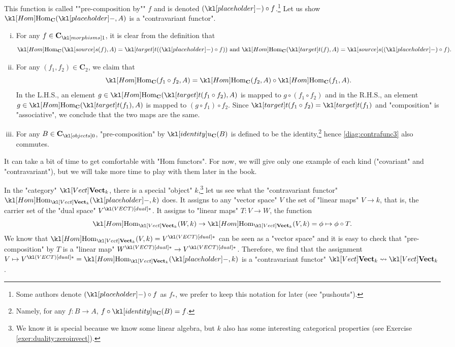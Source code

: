 \documentclass[main.tex]{subfiles}
\begin{document}
\begin{exmp}
\begin{enumerate}
		\AP This function is called ""pre-composition by"" $f$ and is denoted $(\placeholder) \circ f$.\footnote{Some authors denote $(\placeholder) \circ f$ as $f_*$, we prefer to keep this notation for later (see "pushouts").} Let us show $\Hom_{\mathbf{C}}(\placeholder,A)$ is a "contravariant functor".
		\begin{enumerate}[i.]
			\item For any $f \in \mor{\mathbf{C}}$, it is clear from the definition that \[\Hom_{\mathbf{C}}(\source(f),A) = \target((\placeholder) \circ f))\text{ and } \Hom_{\mathbf{C}}(\target(f),A) = \source((\placeholder) \circ f).\]
			\item For any $(f_1,f_2) \in \mathbf{C}_2$, we claim that \[\Hom_{\mathbf{C}}(f_1\circ f_2,A) = \Hom_{\mathbf{C}}(f_2,A)\circ \Hom_{\mathbf{C}}(f_1,A).\] In the L.H.S., an element $g \in \Hom_{\mathbf{C}}(\target(f_1\circ f_2),A)$ is mapped to $g\circ (f_1 \circ f_2)$ and in the R.H.S., an element $g \in \Hom_{\mathbf{C}}(\target(f_1),A)$ is mapped to $(g\circ f_1) \circ f_2$. Since $\target(f_1 \circ f_2) = \target(f_1)$ and "composition" is "associative", we conclude that the two maps are the same.
			\item For any $B \in \obj{\mathbf{C}}$, "pre-composition" by $\idu_{\mathbf{C}}(B)$ is defined to be the identity,\footnote{Namely, for any $f: B \rightarrow A$, $f \circ \idu_{\mathbf{C}}(B) = f$.} hence \eqref{diag:contrafunc3} also commutes.
		\end{enumerate}
	\end{enumerate}
\end{exmp}
It can take a bit of time to get comfortable with "Hom functors". For now, we will give only one example of each kind ("covariant" and "contravariant"), but we will take more time to play with them later in the book.
\begin{exmp}\label{exmp:ringoffunc}
\end{exmp}
\begin{exmp}
	In the "category" $\catVect{k}$, there is a special "object" $k$,\footnote{We know it is special because we know some linear algebra, but $k$ also has some interesting categorical properties (see Exercise \ref{exer:duality:zeroinvect}).} let us see what the "contravariant functor" $\Hom_{\catVect{k}}(\placeholder, k)$ does. It assigns to any "vector space" $V$ the set of "linear maps" $V \rightarrow k$, that is, the carrier set of the "dual space" $\dual{V}$. It assigns to "linear maps" $T: V \rightarrow W$, the function \[\Hom_{\catVect{k}}(W,k) \rightarrow \Hom_{\catVect{k}}(V,k) = \phi \mapsto \phi \circ T.\]
	We know that $\Hom_{\catVect{k}}(V,k) = \dual{V}$ can be seen as a "vector space" and it is easy to check that "pre-composition" by $T$ is a "linear map" $\dual{W} \rightarrow \dual{V}$. Therefore, we find that the assignment $V \mapsto \dual{V} = \Hom_{\catVect{k}}(\placeholder,k)$ is a "contravariant functor" $\catVect{k} \rightsquigarrow \catVect{k}$.
\end{exmp}
\end{document}
